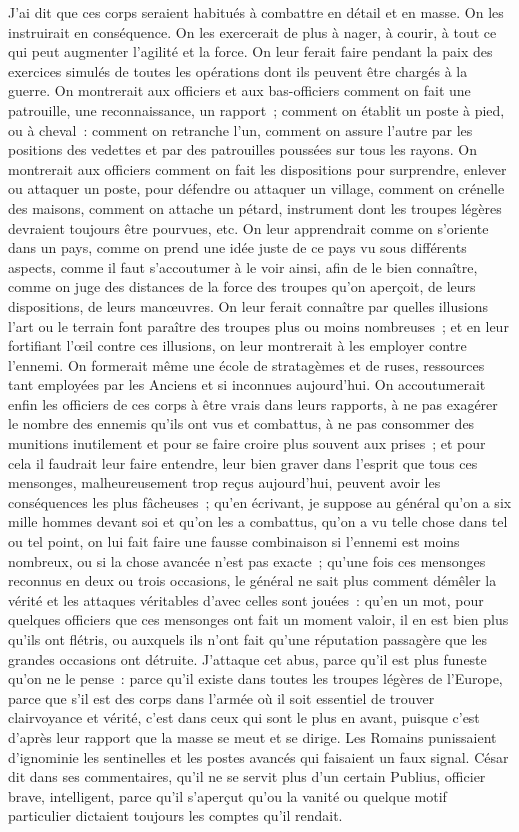 \documentclass[french,twoside]{book} %
\begin{document}
J’ai dit que ces corps seraient habitués à combattre en détail et en masse. On les instruirait en conséquence. On les exercerait de plus à nager, à courir, à tout ce qui peut augmenter l’agilité et la force. On leur ferait faire pendant la paix des exercices simulés de toutes les opérations dont ils peuvent être chargés à la guerre. On montrerait aux officiers et aux bas-officiers comment on fait une patrouille, une reconnaissance, un rapport ; comment on établit un poste à pied, ou à cheval : comment on retranche l’un, comment on assure l’autre par les positions des vedettes et par des patrouilles poussées sur tous les rayons. On montrerait aux officiers comment on fait les dispositions pour surprendre, enlever ou attaquer un poste, pour défendre ou attaquer un village, comment on crénelle des maisons, comment on attache un pétard, instrument dont les troupes légères devraient toujours être pourvues, etc. On leur apprendrait comme on s’oriente dans un pays, comme on prend une idée juste de ce pays vu sous différents aspects, comme il faut s’accoutumer à le voir ainsi, afin de le bien connaître, comme on juge des distances de la force des troupes qu’on aperçoit, de leurs dispositions, de leurs manœuvres. On leur ferait connaître par quelles illusions l’art ou le terrain font paraître des troupes plus ou moins nombreuses ; et en leur fortifiant l’œil contre ces illusions, on leur montrerait à les employer contre l’ennemi. On formerait même une école de stratagèmes et de ruses, ressources tant employées par les Anciens et si inconnues aujourd’hui. On accoutumerait enfin les officiers de ces corps à être vrais dans leurs rapports, à ne pas exagérer le nombre des ennemis qu’ils ont vus et combattus, à ne pas consommer des munitions inutilement et pour se faire croire plus souvent aux prises ; et pour cela il faudrait leur faire entendre, leur bien graver dans l’esprit que tous ces mensonges, malheureusement trop reçus aujourd’hui, peuvent avoir les conséquences les plus fâcheuses ; qu’en écrivant, je suppose au général qu’on a six mille hommes devant soi et qu’on les a combattus, qu’on a vu telle chose dans tel ou tel point, on lui fait faire une fausse combinaison si l’ennemi est moins nombreux, ou si la chose avancée n’est pas exacte ; qu’une fois ces mensonges reconnus en deux ou trois occasions, le général ne sait plus comment démêler la vérité et les attaques véritables d’avec celles sont jouées : qu’en un mot, pour quelques officiers que ces mensonges ont fait un moment valoir, il en est bien plus qu’ils ont flétris, ou auxquels ils n’ont fait qu’une réputation passagère que les grandes occasions ont détruite. J’attaque cet abus, parce qu’il est plus funeste qu’on ne le pense : parce qu’il existe dans toutes les troupes légères de l’Europe, parce que s’il est des corps dans l’armée où il soit essentiel de trouver clairvoyance et vérité, c’est dans ceux qui sont le plus en avant, puisque c’est d’après leur rapport que la masse se meut et se dirige. Les Romains punissaient d’ignominie les sentinelles et les postes avancés qui faisaient un faux signal. César dit dans ses commentaires, qu’il ne se servit plus d’un certain Publius, officier brave, intelligent, parce qu’il s’aperçut qu’ou la vanité ou quelque motif particulier dictaient toujours les comptes qu’il rendait.\par
\end{document}
